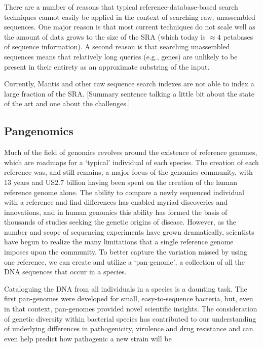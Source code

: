There are a number of reasons that typical reference-database-based search techniques cannot easily be applied in the context of searching raw, unassembled sequences. One major reason is that most current techniques do not scale well as the amount of data grows to the size of the SRA (which today is $\approx4$ petabases of sequence information). A second reason is that searching unassembled sequences means that relatively long queries (e.g., genes) are unlikely to be present in their entirety as an approximate substring of the input.



\begin{rproblem}
Currently, Mantis and other raw sequence search indexes are not able to index a large fraction of the SRA.
[Summary sentence talking a little bit about the state of the art and one about the challenges.]
\label{rprob:peppermint}
\end{rproblem}

\subsection{Pangenomics}

Much of the field of genomics revolves around the existence of reference genomes, which are roadmaps for a ‘typical’ individual of each species. The creation of each reference was, and still remains, a major focus of the genomics community, with 13 years and US$2.7$ billion having been spent on the creation of the human reference genome alone. The ability to compare a newly sequenced individual with a reference and find differences has enabled myriad discoveries and innovations, and in human genomics this ability has formed the basis of thousands of studies seeking the genetic origins of disease. However, as the number and scope of sequencing experiments have grown dramatically, scientists have begun to realize the many limitations that a single reference genome imposes upon the community. To better capture the variation missed by using one reference, we can create and utilize a ‘pan-genome’, a collection of all the DNA sequences that occur in a species.

Cataloguing the DNA from all individuals in a species is a daunting task. The first pan-genomes were developed for small, easy-to-sequence bacteria, but, even in that context, pan-genomes provided novel scientific insights. The consideration of genetic diversity within bacterial species has contributed to our understanding of underlying differences in pathogenicity, virulence and drug resistance and can even help predict how pathogenic a new strain will be


